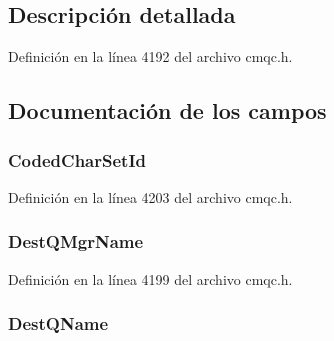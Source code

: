 \subsection{Descripción detallada}


Definición en la línea 4192 del archivo cmqc.\+h.



\subsection{Documentación de los campos}
\hypertarget{structtag_m_q_d_l_h_a4d8d1961a991850d1355cdf9b4680b8e}{}
\subsubsection[{Coded\+Char\+Set\+Id}]{ Coded\+Char\+Set\+Id}\label{structtag_m_q_d_l_h_a4d8d1961a991850d1355cdf9b4680b8e}


Definición en la línea 4203 del archivo cmqc.\+h.

\hypertarget{structtag_m_q_d_l_h_a146f52cd7bae6a5b36ec1314f079ffb2}{}
\subsubsection[{Dest\+Q\+Mgr\+Name}]{ Dest\+Q\+Mgr\+Name}\label{structtag_m_q_d_l_h_a146f52cd7bae6a5b36ec1314f079ffb2}


Definición en la línea 4199 del archivo cmqc.\+h.

\hypertarget{structtag_m_q_d_l_h_a90aa2a325ec2520d431f1924f7cf5cf0}{}
\subsubsection[{Dest\+Q\+Name}]{ Dest\+Q\+Name}\label{structtag_m_q_d_l_h_a90aa2a325ec2520d431f1924f7cf5cf0}


